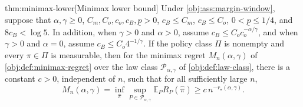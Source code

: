 \begin{theoremv}{thm:minimax-lower}[Minimax lower bound]
Under \cref{obj:ass:margin-window}, suppose that \(\alpha,\gamma\ge0\), \(C_m,C_o,c_o,c_B,\underline p>0\), \(c_B\le C_m\), \(c_B\le C_o\), \(0<\underline p\le 1/4\), and \(8c_B<\log 5\).  In addition, when \(\gamma>0\) and \(\alpha>0\), assume \(c_B\le C_o c_o^{-\alpha/\gamma}\), and when \(\gamma>0\) and \(\alpha=0\), assume \(c_B\le C_o 4^{-1/\gamma}\).  If the policy class \(\Pi\) is nonempty and every \(\pi\in\Pi\) is measurable, then for the minimax regret \(M_n(\alpha,\gamma)\) of \cref{obj:def:minimax-regret} over the law class \(\mathcal P_{\alpha,\gamma}\) of \cref{obj:def:law-class}, there is a constant \(c>0\), independent of \(n\), such that for all sufficiently large \(n\),
\[
M_n(\alpha,\gamma)
=
\inf_{\widehat\pi}
\sup_{P\in\mathcal P_{\alpha,\gamma}}
\mathbb E_P R_P(\widehat\pi)
\ge
c\,n^{-r_\star(\alpha,\gamma)}.
\]
\end{theoremv}

